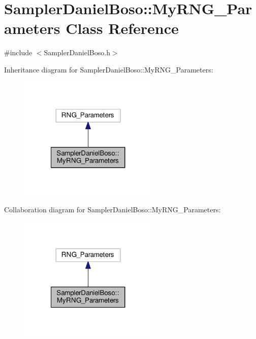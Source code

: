 \hypertarget{class_sampler_daniel_boso_1_1_my_r_n_g___parameters}{\section{Sampler\-Daniel\-Boso\-:\-:My\-R\-N\-G\-\_\-\-Parameters Class Reference}
\label{class_sampler_daniel_boso_1_1_my_r_n_g___parameters}
}


{\ttfamily \#include $<$Sampler\-Daniel\-Boso.\-h$>$}



Inheritance diagram for Sampler\-Daniel\-Boso\-:\-:My\-R\-N\-G\-\_\-\-Parameters\-:
\nopagebreak
\begin{figure}[H]
\begin{center}
\leavevmode
\includegraphics[width=188pt]{class_sampler_daniel_boso_1_1_my_r_n_g___parameters__inherit__graph}
\end{center}
\end{figure}


Collaboration diagram for Sampler\-Daniel\-Boso\-:\-:My\-R\-N\-G\-\_\-\-Parameters\-:
\nopagebreak
\begin{figure}[H]
\begin{center}
\leavevmode
\includegraphics[width=188pt]{class_sampler_daniel_boso_1_1_my_r_n_g___parameters__coll__graph}
\end{center}
\end{figure}
